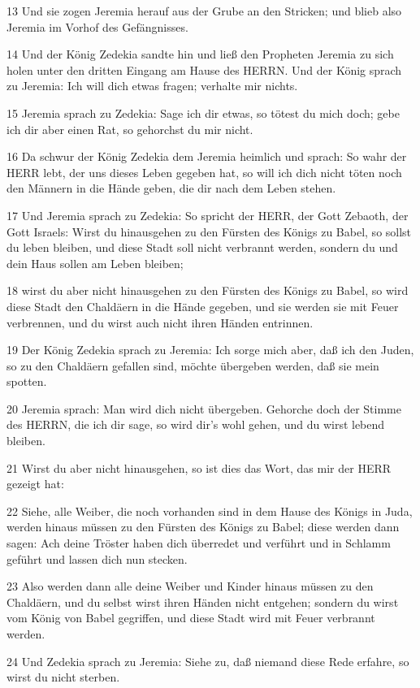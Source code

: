 \par 13 Und sie zogen Jeremia herauf aus der Grube an den Stricken; und blieb also Jeremia im Vorhof des Gefängnisses.
\par 14 Und der König Zedekia sandte hin und ließ den Propheten Jeremia zu sich holen unter den dritten Eingang am Hause des HERRN. Und der König sprach zu Jeremia: Ich will dich etwas fragen; verhalte mir nichts.
\par 15 Jeremia sprach zu Zedekia: Sage ich dir etwas, so tötest du mich doch; gebe ich dir aber einen Rat, so gehorchst du mir nicht.
\par 16 Da schwur der König Zedekia dem Jeremia heimlich und sprach: So wahr der HERR lebt, der uns dieses Leben gegeben hat, so will ich dich nicht töten noch den Männern in die Hände geben, die dir nach dem Leben stehen.
\par 17 Und Jeremia sprach zu Zedekia: So spricht der HERR, der Gott Zebaoth, der Gott Israels: Wirst du hinausgehen zu den Fürsten des Königs zu Babel, so sollst du leben bleiben, und diese Stadt soll nicht verbrannt werden, sondern du und dein Haus sollen am Leben bleiben;
\par 18 wirst du aber nicht hinausgehen zu den Fürsten des Königs zu Babel, so wird diese Stadt den Chaldäern in die Hände gegeben, und sie werden sie mit Feuer verbrennen, und du wirst auch nicht ihren Händen entrinnen.
\par 19 Der König Zedekia sprach zu Jeremia: Ich sorge mich aber, daß ich den Juden, so zu den Chaldäern gefallen sind, möchte übergeben werden, daß sie mein spotten.
\par 20 Jeremia sprach: Man wird dich nicht übergeben. Gehorche doch der Stimme des HERRN, die ich dir sage, so wird dir's wohl gehen, und du wirst lebend bleiben.
\par 21 Wirst du aber nicht hinausgehen, so ist dies das Wort, das mir der HERR gezeigt hat:
\par 22 Siehe, alle Weiber, die noch vorhanden sind in dem Hause des Königs in Juda, werden hinaus müssen zu den Fürsten des Königs zu Babel; diese werden dann sagen: Ach deine Tröster haben dich überredet und verführt und in Schlamm geführt und lassen dich nun stecken.
\par 23 Also werden dann alle deine Weiber und Kinder hinaus müssen zu den Chaldäern, und du selbst wirst ihren Händen nicht entgehen; sondern du wirst vom König von Babel gegriffen, und diese Stadt wird mit Feuer verbrannt werden.
\par 24 Und Zedekia sprach zu Jeremia: Siehe zu, daß niemand diese Rede erfahre, so wirst du nicht sterben.
